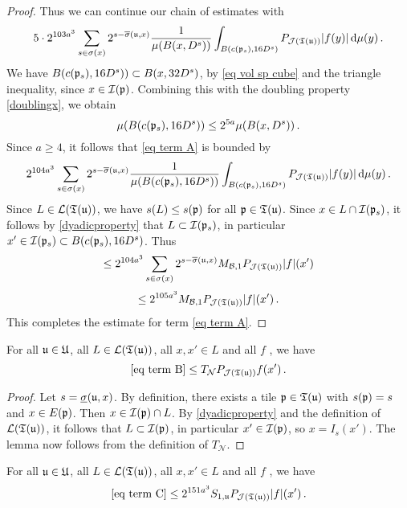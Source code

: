 \begin{proof}
    Thus we can continue our chain of estimates with
    $$
        5\cdot 2^{103a^3} \sum_{s\in\sigma(x)}2^{s - \overline{\sigma}(\mathfrak u, x)} \frac{1}{\mu(B(x,D^s))}\int_{B(c(\mathfrak p_s),16 D^s)}P_{\mathcal{J}(\mathfrak T(\mathfrak u))}|f(y)|\,\mathrm{d}\mu(y)\,.
    $$
    We have $B(c(\mathfrak p_s), 16D^s)) \subset B(x, 32D^s)$, by \eqref{eq vol sp cube} and the triangle inequality, since $x \in \mathcal{I}(\mathfrak p)$. Combining this with the doubling property \eqref{doublingx}, we obtain
    $$
        \mu(B(c(\mathfrak p_s), 16D^s)) \le 2^{5a} \mu(B(x, D^s))\,.
    $$
    Since $a \ge 4$, it follows that \eqref{eq term A} is bounded by
    $$
        2^{104a^3} \sum_{s\in\sigma(x)}2^{s - \overline{\sigma}(\mathfrak u, x)} \frac{1}{\mu(B(c(\mathfrak p_s),16D^s))}\int_{B(c(\mathfrak p_s),16D^s)}P_{\mathcal{J}(\mathfrak T(\mathfrak u))}|f(y)|\,\mathrm{d}\mu(y)\,.
    $$
    Since $L \in \mathcal{L}(\mathfrak T(\mathfrak u))$, we have $s(L) \le s(\mathfrak p)$ for all $\mathfrak p \in \mathfrak T(\mathfrak u)$. Since $x\in L \cap \mathcal{I}(\mathfrak p_s)$, it follows by \eqref{dyadicproperty} that $L \subset \mathcal{I}(\mathfrak p_s)$, in particular $x' \in \mathcal{I}(\mathfrak p_s) \subset B(c(\mathfrak p_s), 16D^s)$. Thus
    $$
        \le 2^{104a^3} \sum_{s\in\sigma(x)}2^{s - \overline{\sigma}(\mathfrak u, x)} M_{\mathcal{B}, 1}P_{\mathcal{J}(\mathfrak T(\mathfrak u))}|f|(x')
    $$
    $$
        \le 2^{105a^3} M_{\mathcal{B}, 1}P_{\mathcal{J}(\mathfrak T(\mathfrak u))}|f|(x')\,.
    $$
    This completes the estimate for term \eqref{eq term A}.
\end{proof}

\begin{lemma}
    \label{lem term B}
    For all $\mathfrak u \in \mathfrak U$, all $L \in \mathcal{L}(\mathfrak T(\mathfrak u))$, all $x, x' \in L$ and all $f$ , we have
    $$
        \eqref{eq term B} \le T_{\mathcal{N}} P_{\mathcal{J}(\mathfrak T(\mathfrak u))} f(x')\,.
    $$
\end{lemma}

\begin{proof}
    Let $s = \underline{\sigma}(\mathfrak u, x)$. By definition, there exists a tile $\mathfrak p \in \mathfrak T(\mathfrak u)$ with $s(\mathfrak p) = s$ and $x \in E(\mathfrak p)$. Then $x \in \mathcal{I}(\mathfrak p) \cap L$. By \eqref{dyadicproperty} and the definition of $\mathcal{L}(\mathfrak T(\mathfrak u))$, it follows that $L \subset \mathcal{I}(\mathfrak p)$, in particular $x' \in \mathcal{I}(\mathfrak p)$, so $x = I_s(x')$.
    The lemma now follows from the definition of $T_{\mathcal{N}}$.
\end{proof}

\begin{lemma}
    \label{lem term C}
    For all $\mathfrak u \in \mathfrak U$, all $L \in \mathcal{L}(\mathfrak T(\mathfrak u))$, all $x, x' \in L$ and all $f$ , we have
    $$
        \eqref{eq term C} \le 2^{151a^3} S_{1,\mathfrak u} P_{\mathcal{J}(\mathfrak T(\mathfrak u))}|f|(x')\,.
    $$
\end{lemma}

